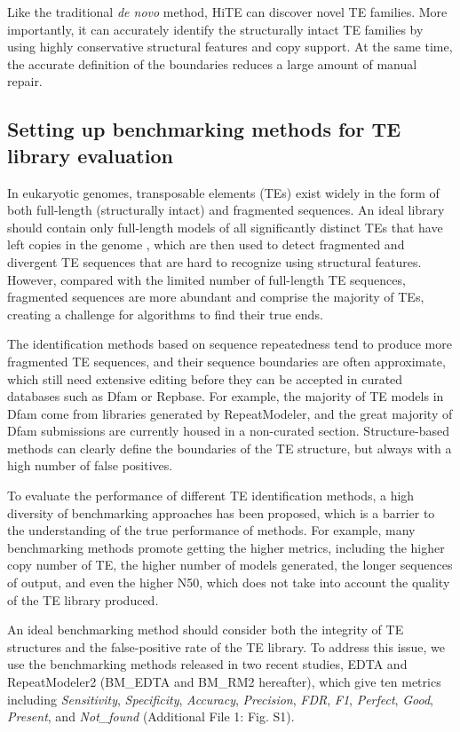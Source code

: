 \documentclass{bmcart}
\begin{document}
Like the traditional \emph{de novo} method, HiTE can discover novel TE families. More importantly, it can accurately identify the structurally intact TE families by using highly conservative structural features and copy support. At the same time, the accurate definition of the boundaries reduces a large amount of manual repair.

\subsection*{Setting up benchmarking methods for TE library evaluation}
In eukaryotic genomes, transposable elements (TEs) exist widely in the form of both full-length (structurally intact) and fragmented sequences. An ideal library should contain only full-length models of all significantly distinct TEs that have left copies in the genome \cite{storer2022methodologies}, which are then used to detect fragmented and divergent TE sequences that are hard to recognize using structural features. However, compared with the limited number of full-length TE sequences, fragmented sequences are more abundant and comprise the majority of TEs, creating a challenge for algorithms to find their true ends.

The identification methods based on sequence repeatedness tend to produce more fragmented TE sequences, and their sequence boundaries are often approximate, which still need extensive editing before they can be accepted in curated databases such as Dfam or Repbase\cite{storer2022methodologies, bell2022transposable}. For example, the majority of TE models in Dfam come from libraries generated by RepeatModeler, and the great majority of Dfam submissions are currently housed in a non-curated section\cite{storer2021dfam}. Structure-based methods can clearly define the boundaries of the TE structure, but always with a high number of false positives.

To evaluate the performance of different TE identification methods, a high diversity of benchmarking approaches has been proposed, which is a barrier to the understanding of the true performance of methods\cite{storer2022methodologies}. For example, many benchmarking methods promote getting the higher metrics, including the higher copy number of TE, the higher number of models generated, the longer sequences of output, and even the higher N50, which does not take into account the quality of the TE library produced.

An ideal benchmarking method should consider both the integrity of TE structures and the false-positive rate of the TE library. To address this issue, we use the benchmarking methods released in two recent studies, EDTA\cite{ou2019benchmarking} and RepeatModeler2\cite{flynn2020repeatmodeler2} (BM\_EDTA and BM\_RM2 hereafter), which give ten metrics including \emph{Sensitivity}, \emph{Specificity}, \emph{Accuracy}, \emph{Precision}, \emph{FDR}, \emph{F1}, \emph{Perfect}, \emph{Good}, \emph{Present}, and \emph{Not\_found} (Additional File 1: Fig. S1).
\end{document}
